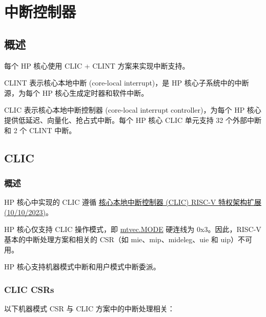\documentclass[main\_\_CN.tex]{subfiles}
\begin{document}
\newpage
\section{中断控制器}
\label{sec:riscvcpu-int-ctrl}


\subsection{概述}
\label{sec:riscvcpu-intr-overview}

每个 HP 核心使用 CLIC + CLINT 方案来实现中断支持。

CLINT 表示核心本地中断 (core-local interrupt)，是 HP 核心子系统中的中断源，为每个 HP 核心生成定时器和软件中断。

CLIC 表示核心本地中断控制器 (core-local interrupt controller)，为每个 HP 核心提供低延迟、向量化、抢占式中断。每个 HP 核心 CLIC 单元支持 32 个外部中断和 2 个 CLINT 中断。


\subsection{CLIC}
\label{sec:riscvcpu-clic}

\subsubsection{概述}
\label{sec:riscvcpu-clic-overview}

HP 核心中实现的 CLIC 遵循 \href{https://github.com/riscv/riscv-fast-interrupt/blob/v0.10/src/clic.adoc}{核心本地中断控制器 (CLIC) RISC-V 特权架构扩展 (10/10/2023)}。

HP 核心仅支持 CLIC 操作模式，即 \hyperref[fielddesc:MTVECMODE]{mtvec.MODE} 硬连线为 0x3。因此，RISC-V 基本的中断处理方案和相关的 CSR（如 mie、mip、mideleg、uie 和 uip）不可用。

HP 核心支持机器模式中断和用户模式中断委派。

\subsubsection{CLIC CSRs}
\label{sec:riscvcpu-clic-csrs}

以下机器模式 CSR 与 CLIC 方案中的中断处理相关：
\end{document}
